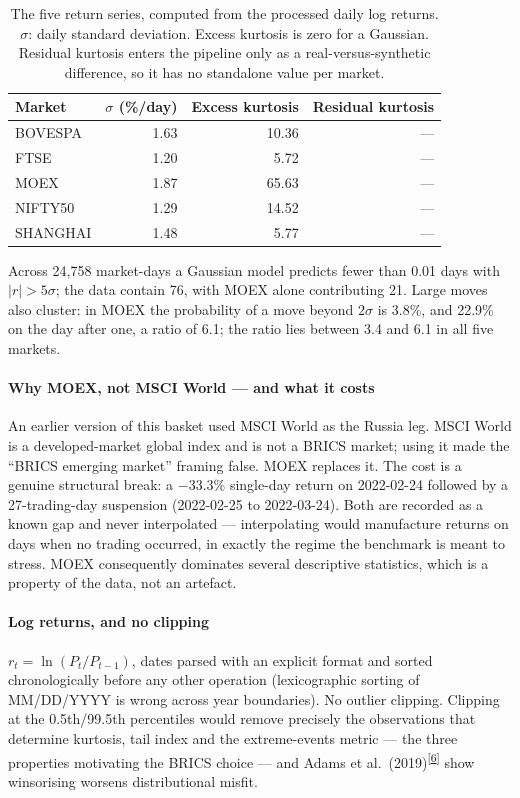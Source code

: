 \documentclass[11pt,a4paper]{article}
\makeatletter
\newcommand{\tcite}[1]{\textsuperscript{[\hyperlink{R:#1}{#1}]}}
\DeclareRobustCommand{\_}{\ifmmode\nfss@text{\textunderscore}\else\textunderscore\allowbreak\fi}
\makeatother
\begin{document}
\begin{table}[htbp]
\centering
\caption{The five return series, computed from the processed daily log returns. $\sigma$: daily standard deviation. Excess kurtosis is zero for a Gaussian. Residual kurtosis enters the pipeline only as a real-versus-synthetic difference, so it has no standalone value per market.}
\label{tab:data}
\begin{tabular}{@{}lrrr@{}}
\toprule
Market & $\sigma$ (\%/day) & Excess kurtosis & Residual kurtosis \\
\midrule
BOVESPA & 1.63 & 10.36 & --- \\
FTSE & 1.20 & 5.72 & --- \\
MOEX & 1.87 & 65.63 & --- \\
NIFTY50 & 1.29 & 14.52 & --- \\
SHANGHAI & 1.48 & 5.77 & --- \\
\bottomrule
\end{tabular}
\end{table}

Across 24,758 market-days a Gaussian model predicts fewer than 0.01 days with $|r|>5\sigma$; the data contain 76, with MOEX alone contributing 21. Large moves also cluster: in MOEX the probability of a move beyond $2\sigma$ is 3.8\%, and 22.9\% on the day after one, a ratio of 6.1; the ratio lies between 3.4 and 6.1 in all five markets.

\paragraph{Why MOEX, not MSCI World --- and what it costs} An earlier version of this basket used MSCI World as the Russia leg. MSCI World is a developed-market global index and is not a BRICS market; using it made the ``BRICS emerging market'' framing false. MOEX replaces it. The cost is a genuine structural break: a $-33.3\%$ single-day return on 2022-02-24 followed by a 27-trading-day suspension (2022-02-25 to 2022-03-24). Both are recorded as a known gap and never interpolated --- interpolating would manufacture returns on days when no trading occurred, in exactly the regime the benchmark is meant to stress. MOEX consequently dominates several descriptive statistics, which is a property of the data, not an artefact.

\paragraph{Log returns, and no clipping} $r_t = \ln(P_t/P_{t-1})$, dates parsed with an explicit format and sorted chronologically before any other operation (lexicographic sorting of MM/DD/YYYY is wrong across year boundaries). No outlier clipping. Clipping at the 0.5th/99.5th percentiles would remove precisely the observations that determine kurtosis, tail index and the extreme-events metric --- the three properties motivating the BRICS choice --- and Adams et al.\ (2019)\tcite{6} show winsorising worsens distributional misfit.
\end{document}
